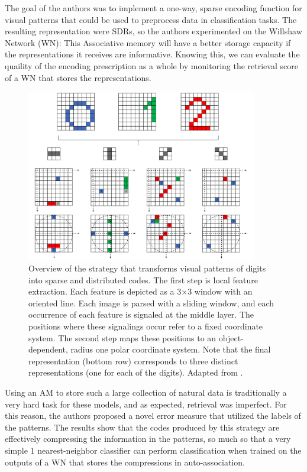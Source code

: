 \documentclass[runningheads]{llncs}
\begin{document}
The goal of the authors was to implement a one-way, sparse encoding function for visual patterns that could be used to preprocess data in classification tasks. The resulting representation were SDRs, so the authors experimented on the Willshaw Network (WN): This Associative memory will have a better storage capacity if the representations it receives are informative. Knowing this, we can evaluate the quaility of the encoding prescription as a whole by monitoring the retrieval score of a WN that stores the representations.

\begin{figure}[h]
    \centering
    \includegraphics[width=0.9\textwidth]{img/sacouto1.png}
    \caption{Overview of the strategy that transforms visual patterns of digits
    into sparse and distributed codes. The first step is local feature
    extraction. Each feature is depicted as a 3×3 window with an oriented line.
    Each image is parsed with a sliding window, and each occurrence of each
    feature is signaled at the middle layer. The positions where these signalings
    occur refer to a fixed coordinate system. The second step maps these
    positions to an object-dependent, radius one polar coordinate system. Note
    that the final representation (bottom row) corresponds to three distinct
    representations (one for each of the digits). Adapted from \cite{sa2020storing}.}
\label{fig:sacouto1}
\end{figure}

Using an AM to store such a large collection of natural data is traditionally a very hard task for these models, and as expected, retrieval was imperfect. For this reason, the authors proposed a novel error measure that utilized the labels of the patterns. The results show that the codes produced by this strategy are effectively compressing the information in the patterns, so much so that a very simple 1 nearest-neighbor classifier can perform classification when trained on the outputs of a WN that stores the compressions in auto-association.
\newline
\end{document}
